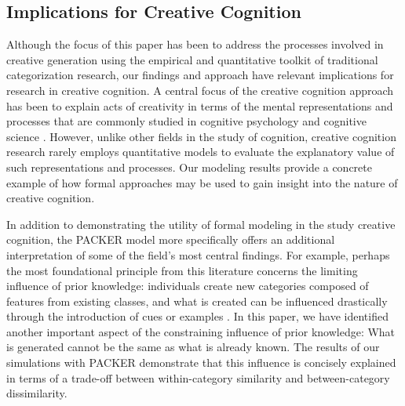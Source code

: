 \documentclass[12pt]{article}
\begin{document}
\begin{flushleft}
\subsection{Implications for Creative Cognition}

Although the focus of this paper has been to address the processes involved in creative generation using the empirical and quantitative toolkit of traditional categorization research, our findings and approach have relevant implications for research in creative cognition. A central focus of the creative cognition approach has been to explain acts of creativity in terms of the mental representations and processes that are commonly studied in cognitive psychology and cognitive science \citep{finke1992creative,smith1995creative}. However, unlike other fields in the study of cognition, creative cognition research rarely employs quantitative models to evaluate the explanatory value of such representations and processes. Our modeling results provide a concrete example of how formal approaches may be used to gain insight into the nature of creative cognition.

In addition to demonstrating the utility of formal modeling in the study creative cognition, the PACKER model more specifically offers an additional interpretation of some of the field's most central findings. For example, perhaps the most foundational principle from this literature concerns the limiting influence of prior knowledge: individuals create new categories composed of features from existing classes, and what is created can be influenced drastically through the introduction of cues or examples \citep{marsh1999inadvertent,smith1993constraining}. In this paper, we have identified another important aspect of the constraining influence of prior knowledge: What is generated cannot be the same as what is already known. The results of our simulations with PACKER demonstrate that this influence is concisely explained in terms of a trade-off between within-category similarity and between-category dissimilarity.


\end{flushleft}
\end{document}

